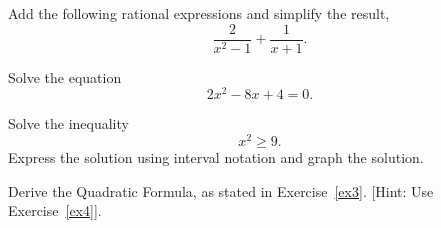 \documentclass[12pt]{amsart}
\begin{document}
\begin{thm}[20 Points]\label{ex8}
  Add the following rational expressions and simplify the result,
  $$\frac{2}{x^2 - 1} + \frac{1}{x+1}.$$
\end{thm}

\newpage

\begin{thm}[20 Points]\label{ex9}
  Solve the equation
  $$2x^2 - 8x + 4 = 0.$$
  \vspace{2in}
\end{thm}

\begin{thm}[20 Points]\label{ex10}
  Solve the inequality $$x^2 \geq 9.$$
  Express the solution using interval notation and graph the solution.
  \vspace{2in}
\end{thm}

\newpage
\begin{thm}\label{bonus}
  Derive the Quadratic Formula, as stated in Exercise~\ref{ex3}.
  [Hint: Use Exercise~\ref{ex4}].
\end{thm}
\end{document}
